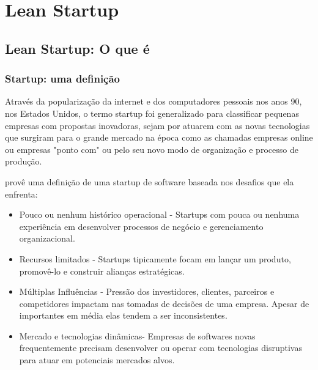 \chapter{Lean Startup}
\label{cap:leanstartup}
\section{Lean Startup: O que é}
\subsection{Startup: uma definição}
\par Através da popularização da internet e dos computadores pessoais nos anos 90, nos Estados Unidos, o termo startup foi generalizado para classificar pequenas empresas com propostas inovadoras, sejam por atuarem com as novas tecnologias que surgiram para o grande mercado na época como as chamadas empresas online ou empresas "ponto com" ou  pelo seu novo modo de organização e processo de produção.
\par \cite{nicolo:14} provê uma definição de uma startup de software baseada nos desafios que ela enfrenta:
\begin{itemize}
\item Pouco ou nenhum histórico operacional - Startups com pouca ou nenhuma experiência em desenvolver processos de negócio e gerenciamento organizacional.
\item Recursos limitados - Startups tipicamente focam em lançar um produto, promovê-lo e construir alianças estratégicas.
\item Múltiplas Influências - Pressão dos investidores, clientes, parceiros e competidores impactam nas tomadas de decisões de uma empresa. Apesar de importantes em média elas tendem a ser inconsistentes.
\item Mercado e tecnologias dinâmicas- Empresas de softwares novas frequentemente precisam desenvolver ou operar com tecnologias disruptivas para atuar em potenciais mercados alvos.
\end{itemize}

